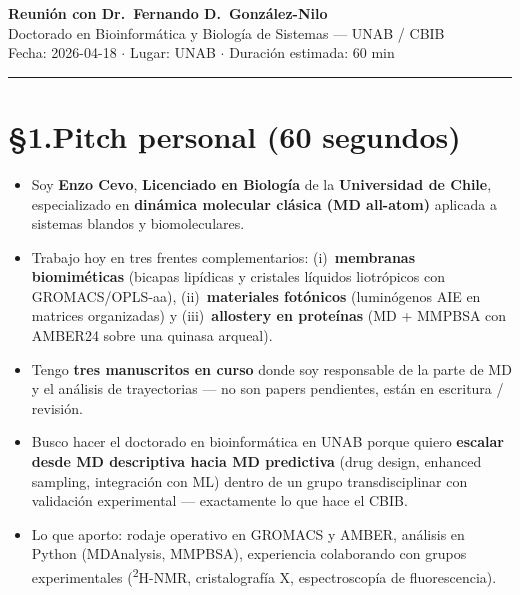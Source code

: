 \documentclass[11pt,a4paper]{article}
\begin{document}
\begin{center}
    {\Large \textbf{Reunión con Dr.\ Fernando D.\ González-Nilo}}\\[2pt]
    {\small Doctorado en Bioinformática y Biología de Sistemas --- UNAB / CBIB}\\[2pt]
    {\small Fecha: 2026-04-18 $\cdot$ Lugar: UNAB $\cdot$ Duración estimada: 60 min}
\end{center}

\vspace{-6pt}
\hrule
\vspace{4pt}

\section*{\S1.\quad Pitch personal (60 segundos)}

\begin{itemize}
    \item Soy \textbf{Enzo Cevo}, \textbf{Licenciado en Biología} de la \textbf{Universidad de Chile}, especializado en \textbf{dinámica molecular clásica (MD all-atom)} aplicada a sistemas blandos y biomoleculares.
    \item Trabajo hoy en tres frentes complementarios: (i)~\textbf{membranas biomiméticas} (bicapas lipídicas y cristales líquidos liotrópicos con GROMACS/OPLS-aa), (ii)~\textbf{materiales fotónicos} (luminógenos AIE en matrices organizadas) y (iii)~\textbf{allostery en proteínas} (MD + MMPBSA con AMBER24 sobre una quinasa arqueal).
    \item Tengo \textbf{tres manuscritos en curso} donde soy responsable de la parte de MD y el análisis de trayectorias --- no son papers pendientes, están en escritura / revisión.
    \item Busco hacer el doctorado en bioinformática en UNAB porque quiero \textbf{escalar desde MD descriptiva hacia MD predictiva} (drug design, enhanced sampling, integración con ML) dentro de un grupo transdisciplinar con validación experimental --- exactamente lo que hace el CBIB.
    \item Lo que aporto: rodaje operativo en GROMACS y AMBER, análisis en Python (MDAnalysis, MMPBSA), experiencia colaborando con grupos experimentales (\textsuperscript{2}H-NMR, cristalografía X, espectroscopía de fluorescencia).
\end{itemize}

\end{document}
